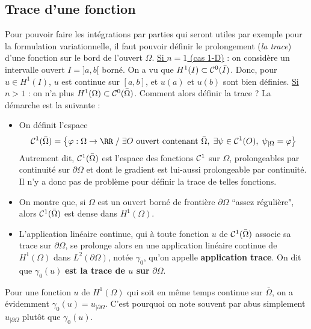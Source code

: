 \subsection{Trace d'une fonction}
%
%
Pour pouvoir faire les int\'egrations par parties qui seront utiles par exemple pour la formulation variationnelle, il faut pouvoir d\'efinir le prolongement ({\em la trace}) d'une fonction sur le bord de l'ouvert $\Omega$.
%
\underline{Si $n=1$ (cas 1-D)} : on consid\`ere un intervalle ouvert $I=]a,b[$ born\'e. On a vu que  $H^1(I) \subset {\cal C}^0(\bar{I})$. Donc, pour $u\in H^1(I)$, $u$ est continue sur $[a,b]$, et $u(a)$ et $u(b)$ sont bien d\'efinies.
%
\underline{Si $n>1$} : on n'a plus $H^1(\Omega) \subset {\cal C}^0(\bar{\Omega})$. Comment alors d\'efinir la trace ? La d\'emarche est la suivante :
\begin{itemize}
\item On d\'efinit l'espace
$$
{\cal C}^1(\bar{\Omega}) = \left\{  \varphi : \Omega \rightarrow \RR \;/\;  \exists O \hbox{ ouvert contenant } \bar{\Omega},\; \exists \psi \in {\cal C}^1(O),\; \psi_{|\Omega} = \varphi \right\}
$$
Autrement dit, ${\cal C}^1(\bar{\Omega})$ est l'espace des fonctions ${\cal C}^1$ sur $\Omega$, prolongeables par continuit\'e sur $\partial\Omega$ et dont le gradient est lui-aussi prolongeable par continuit\'e. Il n'y a donc pas de probl\`eme pour d\'efinir la trace de telles fonctions.
%
\item On montre que, si $\Omega$ est un ouvert born\'e de fronti\`ere $\partial\Omega$ ``assez r\'eguli\`ere", alors ${\cal C}^1(\bar{\Omega})$ est dense dans $H^1(\Omega)$.
%
\item L'application lin\'eaire continue, qui \`a toute fonction $u$ de  ${\cal C}^1(\bar{\Omega})$  associe sa trace sur $\partial\Omega$, se prolonge alors en une application lin\'eaire continue de $H^1(\Omega)$ dans $L^2(\partial\Omega)$, not\'ee $\gamma_0$, qu'on appelle {\bf application trace}.
\boldmath
On dit que $\gamma_0(u)$ {\bf est la trace de $u$ sur }$\partial\Omega$.
\unboldmath
%
\end{itemize}
%
%
Pour une fonction $u$ de $H^1(\Omega)$ qui soit en m\^eme temps continue sur $\bar{\Omega}$, on a \'evidemment $\gamma_0(u) = u_{|\partial\Omega}$. C'est pourquoi on note souvent par abus simplement $u_{|\partial\Omega}$ plut\^ot que $\gamma_0(u)$.

